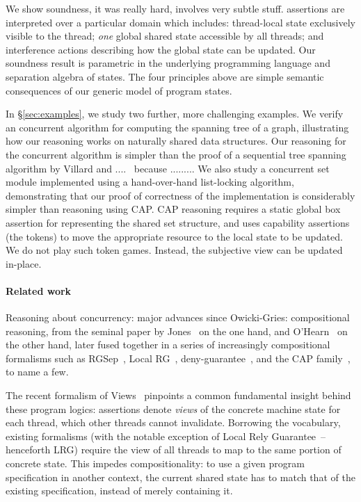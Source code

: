 We show soundness, it was really hard, involves very subtle stuff. 
\colosl
assertions are interpreted over a particular domain which includes:
{thread-local} state exclusively visible to the thread; {\em one}
global shared state accessible by all threads; and { interference
actions}  describing how the global state can be updated.
Our soundness result is parametric in the underlying
  programming language and separation algebra of states. The four
  principles above are simple semantic consequences of our generic
  model of program states.

In \S\ref{sec:examples}, we 
study two further, more challenging examples. We verify an concurrent algorithm for
computing the spanning tree of a graph, illustrating how our reasoning
works on naturally shared data structures. Our  \colosl reasoning for
the concurrent algorithm 
is simpler than the proof of a sequential tree spanning algorithm
by Villard and ....~\cite{??}  because ......... We also study a concurrent set module
implemented using a hand-over-hand list-locking algorithm,
demonstrating that our proof of correctness of the implementation is
considerably simpler than reasoning using CAP. CAP reasoning requires
a static global box assertion for representing the shared set
structure, and uses capability assertions (the tokens) 
to move the appropriate resource to the local state to be
updated. We do not play such token games. Instead, the subjective
view can be updated in-place. 










\paragraph{Related work}




Reasoning about concurrency: major advances since Owicki-Gries:
compositional reasoning, from the seminal paper by Jones~\cite{rg} on
the one hand, and O'Hearn~\cite{csl-orig,csl-tcs} on the other hand,
later fused together in a series of increasingly compositional
formalisms such as RGSep~\cite{viktor-marriage}, Local RG~\cite{lrg},
deny-guarantee~\cite{dg}, and the CAP
family~\cite{cap-ecoop10,icap,tada}, to name a few.


The recent formalism of Views~\cite{views} pinpoints a common
fundamental insight behind these program logics: assertions denote
\emph{views} of the concrete machine state for each thread, which
other threads cannot invalidate. Borrowing the vocabulary, existing
formalisms (with the notable exception of Local Rely
Guarantee~\cite{lrg}--henceforth LRG) require the view of all threads
to map to the same portion of concrete state. This impedes
compositionality: to use a given program specification in another
context, the current shared state has to match that of the existing
specification, instead of merely containing it. 

